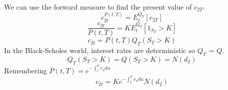 \documentclass[12pt]{article}
\begin{document}
We can use the forward measure to find the present value of $c_{2T}$.
$$c_{2t}^{P(t,T)}=E_t^{Q_T}[c_{2T}]$$
$$\frac{c_{2t}}{P(t,T)}=KE_t^{Q_T}[1_{S_T}>K]$$
$$c_{2t}=P(t,T)Q_T(S_T>K)$$
In the Black-Scholes world, interest rates are deterministic so $Q_T$ = $Q$.
$$Q_T(S_T>K)=Q(S_T>K)=N(d_2)$$
Remembering $P(t,T)=e^{-\int_t^Tr_udu}$
\begin{equation} \label{c2t}
  c_{2t}=Ke^{-\int_t^Tr_udu}N(d_2)
\end{equation}
\end{document}
